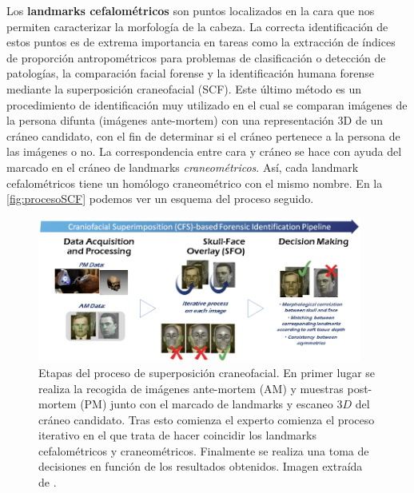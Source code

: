     \noindent Los \textbf{landmarks cefalométricos} son puntos localizados en la cara que nos permiten caracterizar la morfología de la cabeza. La correcta identificación de estos puntos es de extrema importancia en tareas como la extracción de índices de proporción antropométricos para problemas de clasificación o detección de patologías, la comparación facial forense y la identificación humana forense mediante la superposición craneofacial (SCF). Este último método es un procedimiento de identificación muy utilizado en el cual se comparan imágenes de la persona difunta (imágenes ante-mortem) con una representación 3D de un cráneo candidato, con el fin de determinar si el cráneo pertenece a la persona de las imágenes o no. La correspondencia entre cara y cráneo se hace con ayuda del marcado en el cráneo de landmarks \textit{craneométricos}. Así, cada landmark cefalométricos tiene un homólogo craneométrico con el mismo nombre. En la \autoref{fig:procesoSCF}  podemos ver un esquema del proceso seguido.

    \begin{figure}[!h]
        \centering
        \includegraphics[width=0.95\textwidth]{img/SCF.png}
        \caption{Etapas del proceso de superposición craneofacial. En primer lugar se realiza la recogida de imágenes ante-mortem (AM) y muestras post-mortem (PM) junto con el marcado de landmarks y escaneo $3D$ del cráneo candidato. Tras esto comienza el experto comienza el proceso iterativo en el que trata de hacer coincidir los landmarks cefalométricos y craneométricos. Finalmente se realiza una toma de decisiones en función de los resultados obtenidos. Imagen extraída de \cite{article}.}
        \label{fig:procesoSCF}
    \end{figure}

    \medskip

